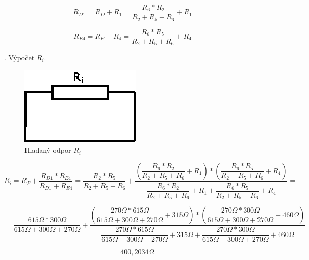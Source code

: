 \documentclass[a4paper,12pt]{article}
\begin{document}
\begin{equation}
R_{D1} = R_D + R_1 = \frac{R_6 * R_2}{R_2 + R_5 + R_6} + R_1
\end{equation}

\begin{equation}
R_{E4} = R_E + R_4 = \frac{R_6 * R_5}{R_2 + R_5 + R_6} + R_4
\end{equation}

. Výpočet $R_i$.
\begin{figure}[!htb]
\centering
\includegraphics[scale=1.5]{p2/p4.eps}
\caption{Hľadaný odpor $R_i$}
\end{figure}


\begin{equation}
R_i = R_F + \frac {R_{D1} * R_{E4}}{R_{D1} + R_{E4}} = \frac{R_2 * R_5}{R_2 + R_5 + R_6} +
\frac{(\dfrac{R_6 * R_2}{R_2 + R_5 + R_6} + R_1) * (\dfrac{R_6 * R_5}{R_2 + R_5 + R_6} + R_4)}{\dfrac{R_6 * R_2}{R_2 + R_5 + R_6} + R_1 + \dfrac{R_6 * R_5}{R_2 + R_5 + R_6} + R_4} =
\end{equation}

\begin{equation}
= \frac{615\Omega * 300\Omega}{615\Omega + 300\Omega + 270\Omega} +
\frac{(\dfrac{270\Omega * 615\Omega}{615\Omega + 300\Omega + 270\Omega} + 315\Omega) * (\dfrac{270\Omega * 300\Omega}{615\Omega + 300\Omega + 270\Omega} + 460\Omega)}{\dfrac{270\Omega * 615\Omega}{615\Omega + 300\Omega + 270\Omega} + 315\Omega + \dfrac{270\Omega * 300\Omega}{615\Omega + 300\Omega + 270\Omega} + 460\Omega}
\end{equation}

\begin{equation}
= 400,2034\Omega
\end{equation}
\end{document}
